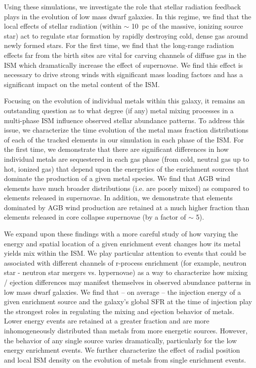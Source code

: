 Using these simulations, we investigate the role that stellar radiation feedback plays in the evolution of low mass dwarf galaxies.
In this regime, we find that the local effects of stellar radiation (within $\sim$ 10~pc of the massive, ionizing source star) act to regulate star formation by rapidly destroying cold, dense gas around newly formed stars. For the first time, we find that the long-range radiation effects far from the birth sites are vital for carving channels of diffuse gas in the ISM which dramatically increase the effect of supernovae. We find this effect is necessary to drive strong winds with significant mass loading factors and has a significant impact on the metal content of the ISM.

Focusing on the evolution of individual metals within this galaxy, it remains an outstanding question as to what degree (if any) metal mixing processes in a multi-phase ISM influence observed stellar abundance patterns. To address this issue, we characterize the time evolution of the metal mass fraction distributions of each of the tracked elements in our simulation in each phase of the ISM. For the first time, we demonstrate that there are significant differences in how individual metals are sequestered in each gas phase (from cold, neutral gas up to hot, ionized gas) that depend upon the energetics of the enrichment sources that dominate the production of a given metal species. We find that AGB wind elements have much broader distributions (i.e. are poorly mixed) as compared to elements released in supernovae. In addition, we demonstrate that elements dominated by AGB wind production are retained at a much higher fraction than elements released in core collapse supernovae (by a factor of $\sim$ 5).

We expand upon these findings with a more careful study of how varying the energy and spatial location of a given enrichment event changes how its metal yields mix within the ISM. We play particular attention to events that could be associated with different channels of r-process enrichment (for example, neutron star - neutron star mergers vs. hypernovae) as a way to characterize how mixing / ejection differences may manifest themselves in observed abundance patterns in low mass dwarf galaxies. We find that -- on average -- the injection energy of a given enrichment source and the galaxy's global SFR at the time of injection play the strongest roles in regulating the mixing and ejection behavior of metals. Lower energy events are retained at a greater fraction and are more inhomogeneously distributed than metals from more energetic sources. However, the behavior of any single source varies dramatically, particularly for the low energy enrichment events. We further characterize the
effect of radial position and local ISM density on the evolution of metals from single enrichment events.

